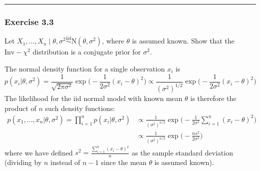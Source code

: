 \documentclass[
  letterpaper,
  DIV=11,
  numbers=noendperiod]{scrartcl}
\begin{document}
\begin{center}\rule{0.5\linewidth}{0.5pt}\end{center}

\subsubsection{Exercise 3.3}\label{exercise-3.3}

Let
\(X_1,\ldots,X_n \mid \theta,\sigma^2 \overset{\mathrm{iid}}{\sim} \mathrm{N}(\theta,\sigma^2)\),
where \(\theta\) is assumed known. Show that the \(\mathrm{Inv-}\chi^2\)
distribution is a conjugate prior for \(\sigma^2\).

\begin{tcolorbox}[enhanced jigsaw, title={Solution}, bottomtitle=1mm, opacityback=0, colback=white, colbacktitle=quarto-callout-note-color!10!white, breakable, left=2mm, colframe=quarto-callout-note-color-frame, coltitle=black, bottomrule=.15mm, leftrule=.75mm, toptitle=1mm, titlerule=0mm, arc=.35mm, rightrule=.15mm, opacitybacktitle=0.6, toprule=.15mm]

The normal density function for a single observation \(x_i\) is \[
 p(x_i \vert \theta, \sigma^2) = \frac{1}{\sqrt{2\pi\sigma^2}}\exp\Big(-\frac{1}{2\sigma^2}(x_i-\theta)^2\Big) \propto \frac{1}{(\sigma^2)^{1/2}}\exp\Big(-\frac{1}{2\sigma^2}(x_i-\theta)^2\Big)
 \] The likelihood for the iid normal model with known mean \(\theta\)
is therefore the product of \(n\) such density functions: \[
 \begin{aligned}
 p(x_1,\ldots,x_n \vert \theta, \sigma^2) = \prod_{i=1}^n p(x_i \vert \theta, \sigma^2) &\propto  \frac{1}{(\sigma^2)^{n/2}}\exp\Big( -\frac{1}{2\sigma^2}\sum_{i=1}^n (x_i-\theta)^2\Big) \\
 &\propto  \frac{1}{(\sigma^2)^{n/2}}\exp\Big( -\frac{n s^2}{2\sigma^2}\Big)
 \end{aligned}
 \] where we have defined
\(s^2 = \frac{\sum_{i=1}^n (x_i-\theta)^2}{n}\) as the sample standard
deviation (dividing by \(n\) instead of \(n-1\) since the mean
\(\theta\) is assumed known).


\end{tcolorbox}
\end{document}

